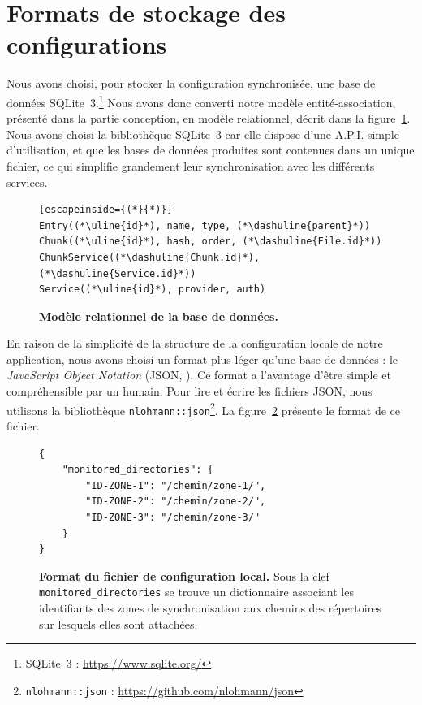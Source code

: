 \section{Formats de stockage des configurations}

Nous avons choisi, pour stocker la configuration synchronisée, une base de données SQLite~3.\footnote{SQLite~3 : \url{https://www.sqlite.org/}} Nous avons donc converti notre modèle entité-association, présenté dans la partie conception, en modèle relationnel, décrit dans la figure~\ref{fig:implementation-config-bd}. Nous avons choisi la bibliothèque SQLite~3 car elle dispose d'une A.P.I. simple d'utilisation, et que les bases de données produites sont contenues dans un unique fichier, ce qui simplifie grandement leur synchronisation avec les différents services.

\begin{figure}[h]
    \begin{lstlisting}[escapeinside={(*}{*)}]
Entry((*\uline{id}*), name, type, (*\dashuline{parent}*))
Chunk((*\uline{id}*), hash, order, (*\dashuline{File.id}*))
ChunkService((*\dashuline{Chunk.id}*), (*\dashuline{Service.id}*))
Service((*\uline{id}*), provider, auth)
    \end{lstlisting}
    \caption{\textbf{Modèle relationnel de la base de données.}}
    \label{fig:implementation-config-bd}
\end{figure}

En raison de la simplicité de la structure de la configuration locale de notre application, nous avons choisi un format plus léger qu'une base de données : le \emph{JavaScript Object Notation} (JSON, \cite{ecma404}). Ce format a l'avantage d'être simple et compréhensible par un humain. Pour lire et écrire les fichiers JSON, nous utilisons la bibliothèque \texttt{nlohmann::json}\footnote{\texttt{nlohmann::json} : \url{https://github.com/nlohmann/json}}. La figure~\ref{fig:conception-local} présente le format de ce fichier.

\begin{figure}[h]
    \begin{verbatim}{
    "monitored_directories": {
        "ID-ZONE-1": "/chemin/zone-1/",
        "ID-ZONE-2": "/chemin/zone-2/",
        "ID-ZONE-3": "/chemin/zone-3/"
    }
}\end{verbatim}
    \caption{\textbf{Format du fichier de configuration local.} Sous la clef \texttt{monitored\_directories} se trouve un dictionnaire associant les identifiants des zones de synchronisation aux chemins des répertoires sur lesquels elles sont attachées.}
    \label{fig:conception-local}
\end{figure}

